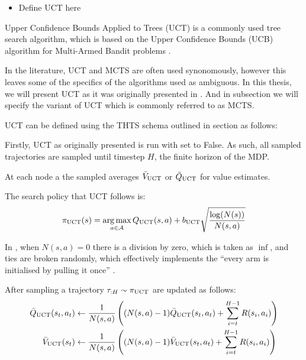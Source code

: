         \begin{itemize}
            \item Define UCT here
        \end{itemize}



        Upper Confidence Bounds Applied to Trees (UCT)  is a commonly used tree search algorithm, which is based on the Upper Confidence Bounds (UCB)  algorithm for Multi-Armed Bandit problems .

        In the literature, UCT and MCTS are often used synonomously, however this leaves some of the specifics of the algorithms used as ambiguous. In this thesis, we will present UCT as it was originally presented in . And in subsection  we will specify the variant of UCT which is commonly referred to as MCTS.

        UCT can be defined using the THTS schema outlined in section  as follows:

        Firstly, UCT as originally presented is run with \mctsmode set to False. As such, all sampled trajectories are sampled until timestep $H$, the finite horizon of the MDP. 

        At each node a the sampled averages $\bar{V}_{\textnormal{UCT}}$ or $\bar{Q}_{\textnormal{UCT}}$ for value estimates.

        The search policy that UCT follows is:
        \begin{align}
            \pi_{\textnormal{UCT}}(s) = \operatorname*{arg\,max}_{a\in\mathcal{A}} Q_{\textnormal{UCT}}(s,a) + b_{\textnormal{UCT}} \sqrt{\frac{\log(N(s))}{N(s,a)}} 
        \end{align}

        In , when $N(s,a)=0$ there is a division by zero, which is taken as $\inf$, and ties are broken randomly, which effectively implements the ``every arm is initialised by pulling it once'' . 

        After sampling a trajectory $\tau_{:H}\sim\pi_{\textnormal{UCT}}$ are updated as follows:
        \begin{align}
            \bar{Q}_{\textnormal{UCT}}(s_t,a_t) &\leftarrow 
                \frac{1}{N(s,a)} \left( (N(s,a)-1) \bar{Q}_{\textnormal{UCT}}(s_t,a_t) 
                    + \sum_{i=t}^{H-1} R(s_i,a_i) \right) \\
            \bar{V}_{\textnormal{UCT}}(s_t) &\leftarrow 
                \frac{1}{N(s,a)} \left( (N(s,a)-1) \bar{V}_{\textnormal{UCT}}(s_t,a_t) 
                    + \sum_{i=t}^{H-1} R(s_i,a_i) \right) 
        \end{align}  


